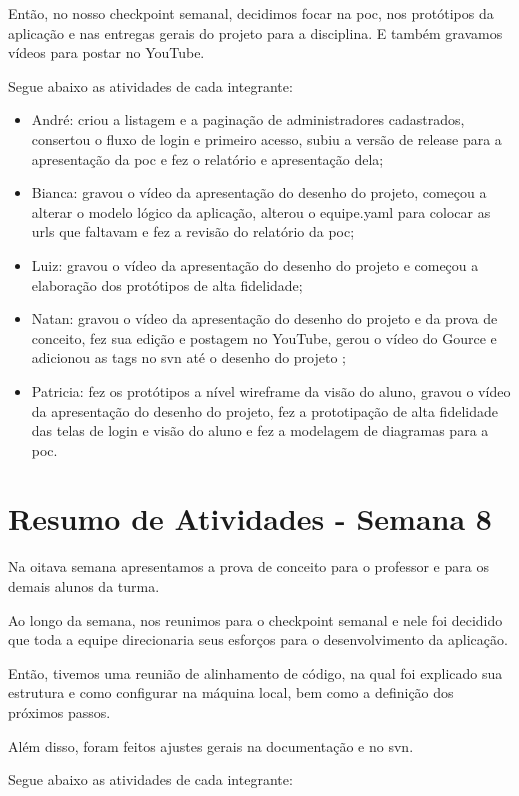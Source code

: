 \begin{apendicesenv}
Então, no nosso checkpoint semanal, decidimos focar na \ac{poc}, nos protótipos da aplicação e nas entregas gerais do projeto para a disciplina. E também gravamos vídeos para postar no YouTube.

Segue abaixo as atividades de cada integrante:

\begin{itemize}
\item André: criou a listagem e a paginação de administradores cadastrados, consertou o fluxo de login e primeiro acesso, subiu a versão de \gls{release} para a apresentação da \ac{poc} e fez o relatório e apresentação dela;
\item Bianca: gravou o vídeo da apresentação do desenho do projeto, começou a alterar o modelo lógico da aplicação, alterou o equipe.yaml para colocar as \ac{url}s que faltavam e fez a revisão do relatório da \ac{poc};
\item Luiz: gravou o vídeo da apresentação do desenho do projeto e começou a elaboração dos protótipos de alta fidelidade;
\item Natan: gravou o vídeo da apresentação do desenho do projeto e da prova de conceito, fez sua edição e postagem no YouTube, gerou o vídeo do Gource e adicionou as tags no \ac{svn} até o desenho do projeto ;
\item Patricia: fez os protótipos a nível \gls{wireframe} da visão do aluno, gravou o vídeo da apresentação do desenho do projeto, fez a prototipação de alta fidelidade das telas de login e visão do aluno e fez a modelagem de diagramas para a \ac{poc}.
\end{itemize}

\section{Resumo de Atividades - Semana 8}
Na oitava semana apresentamos a prova de conceito para o professor e para os demais alunos da turma.

Ao longo da semana, nos reunimos para o \gls{checkpoint} semanal e nele foi decidido que toda a equipe direcionaria seus esforços para o desenvolvimento da aplicação.

Então, tivemos uma reunião de alinhamento de código, na qual foi explicado sua estrutura e como configurar na máquina local, bem como a definição dos próximos passos.

Além disso, foram feitos ajustes gerais na documentação e no \ac{svn}.

Segue abaixo as atividades de cada integrante:


\end{apendicesenv}
